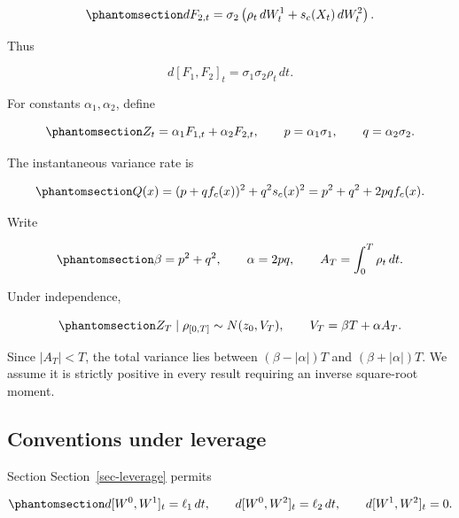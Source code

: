\documentclass[
  english,
  11pt,
  letterpaper,
  DIV=11,
  numbers=noendperiod]{scrartcl}
\theoremstyle{plain}
\theoremstyle{plain}
\theoremstyle{plain}
\theoremstyle{plain}
\theoremstyle{remark}
\begin{document}
\begin{equation}\protect\phantomsection\label{eq-two-forwards}{
dF_{2,t}=\sigma_2
\left(
\rho_t\,dW_t^1+s_c(X_t)\,dW_t^2
\right).
}\end{equation}

Thus

\[
d[F_1,F_2]_t=\sigma_1\sigma_2\rho_t\,dt.
\]

For constants \(\alpha_1,\alpha_2\), define

\begin{equation}\protect\phantomsection\label{eq-linear-combination}{
Z_t=\alpha_1F_{1,t}+\alpha_2F_{2,t},
\qquad
p=\alpha_1\sigma_1,\qquad
q=\alpha_2\sigma_2.
}\end{equation}

The instantaneous variance rate is

\begin{equation}\protect\phantomsection\label{eq-Q}{
Q(x)
=(p+qf_c(x))^2+q^2s_c(x)^2
=p^2+q^2+2pqf_c(x).
}\end{equation}

Write

\begin{equation}\protect\phantomsection\label{eq-clock-definitions}{
\beta=p^2+q^2,\qquad
\alpha=2pq,\qquad
A_T=\int_0^T\rho_t\,dt.
}\end{equation}

Under independence,

\begin{equation}\protect\phantomsection\label{eq-centered-clock-law}{
Z_T\mid\rho_{[0,T]}
\sim N(z_0,V_T),
\qquad
V_T=\beta T+\alpha A_T.
}\end{equation}

Since \(|A_T|<T\), the total variance lies between \((\beta-|\alpha|)T\)
and \((\beta+|\alpha|)T\). We assume it is strictly positive in every
result requiring an inverse square-root moment.

\subsection{Conventions under
leverage}\label{conventions-under-leverage}

Section Section~\ref{sec-leverage} permits

\begin{equation}\protect\phantomsection\label{eq-leverage-brackets}{
d[W^0,W^1]_t=\ell_1\,dt,\qquad
d[W^0,W^2]_t=\ell_2\,dt,
\qquad
d[W^1,W^2]_t=0.
}\end{equation}
\end{document}

